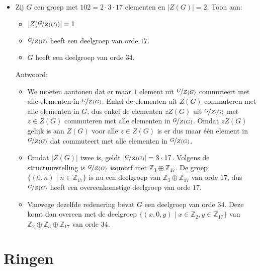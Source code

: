 \documentclass[main.tex]{subfiles}
\begin{document}
\begin{itemize}
 \item 
   Zij $G$ een groep met $102 = 2 \cdot 3 \cdot 17$ elementen en $|Z(G)|=2$. 
   Toon aan:
   \begin{itemize}
   \item $|Z(\nicefrac{G}{Z(G)})| = 1$
   \item $\nicefrac{G}{Z(G)}$ heeft een deelgroep van orde $17$.
   \item $G$ heeft een deelgroep van orde $34$.
   \end{itemize}

   Antwoord:
   \begin{itemize}
   \item
     We moeten aantonen dat er maar $1$ element uit $\nicefrac{G}{Z(G)}$ commuteert met alle elementen in $\nicefrac{G}{Z(G)}$.
     Enkel de elementen uit $Z(G)$ commuteren met alle elementen in $G$, dus enkel de elementen $zZ(G)$ uit $\nicefrac{G}{Z(G)}$ met $z\in Z(G)$ commuteren met alle elementen in $\nicefrac{G}{Z(G)}$.
     Omdat $zZ(G)$ gelijk is aan $Z(G)$ voor alle $z\in Z(G)$ is er dus maar \'e\'en element in $\nicefrac{G}{Z(G)}$ dat commuteert met alle elementen in $\nicefrac{G}{Z(G)}$.
   \item 
     Omdat $|Z(G)|$ twee is, geldt $|\nicefrac{G}{Z(G)}| = 3 \cdot 17$.
     Volgens de structuurstelling is $\nicefrac{G}{Z(G)}$ isomorf met $\mathbb{Z}_{3} \oplus \mathbb{Z}_{17}$. De groep $\{ (0,n) \mid n \in \mathbb{Z}_{17} \}$ is nu een deelgroep van $\mathbb{Z}_{3} \oplus \mathbb{Z}_{17}$ van orde $17$, dus $\nicefrac{G}{Z(G)}$ heeft een overeenkomstige deelgroep van orde $17$.

   \item Vanwege dezelfde redenering bevat $G$ een deelgroep van orde $34$.
     Deze komt dan overeen met de deelgroep $\{ (x,0,y) \mid x\in \mathbb{Z}_{2}, y \in \mathbb{Z}_{17}\}$ van $\mathbb{Z}_{2} \oplus \mathbb{Z}_{3} \oplus \mathbb{Z}_{17}$ van orde $34$.
   \end{itemize}

 \end{itemize}

 \section{Ringen}
 \label{sec:ringen}
\end{document}
